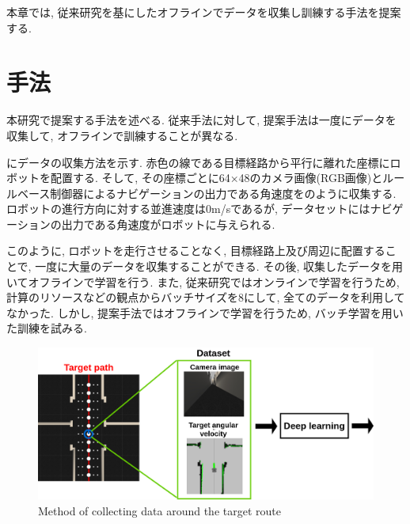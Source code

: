 
本章では, 従来研究を基にしたオフラインでデータを収集し訓練する手法を提案する.

\section{手法}
本研究で提案する手法を述べる. 従来手法に対して, 提案手法は一度にデータを収集して, オフラインで訓練することが異なる. 
\par {}にデータの収集方法を示す. 赤色の線である目標経路から平行に離れた座標にロボットを配置する. そして, その座標ごとに64×48のカメラ画像(RGB画像)とルールベース制御器によるナビゲーションの出力である角速度をのように収集する. ロボットの進行方向に対する並進速度は0m/sであるが, データセットにはナビゲーションの出力である角速度がロボットに与えられる. \par このように, ロボットを走行させることなく, 目標経路上及び周辺に配置することで, 一度に大量のデータを収集することができる. その後, 収集したデータを用いてオフラインで学習を行う. また, 従来研究ではオンラインで学習を行うため, 計算のリソースなどの観点からバッチサイズを8にして, 全てのデータを利用してなかった. しかし, 提案手法ではオフラインで学習を行うため, バッチ学習を用いた訓練を試みる. 

\newpage
  \begin{figure}[h]
  \centering
  \includegraphics[keepaspectratio, scale=0.2]{images/collect-data2.png}
  \caption{Method of collecting data around the target route}
  \label{Fig:collect-data2}
  \end{figure}

